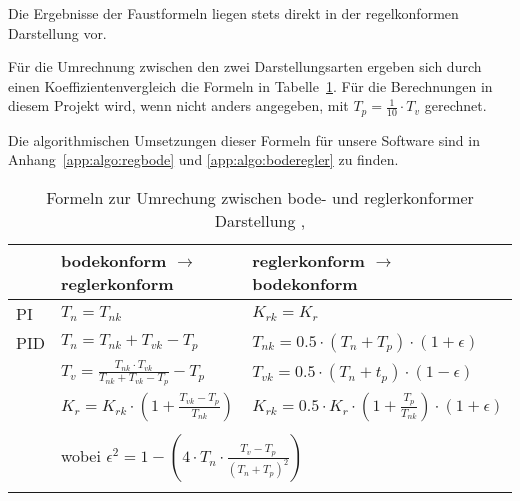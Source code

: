 Die  Ergebnisse der  Faustformeln liegen  stets direkt  in der  regelkonformen
Darstellung vor.

F\"ur     die    Umrechnung     zwischen     den    zwei     Darstellungsarten
ergeben   sich    durch   einen   Koeffizientenvergleich   die    Formeln   in
Tabelle~\ref{tab:bode_regler_konform}.   F\"ur  die   Berechnungen  in  diesem
Projekt wird,  wenn nicht anders  angegeben, mit $T_p=\frac{1}{10}  \cdot T_v$
gerechnet.

Die algorithmischen Umsetzungen  dieser Formeln f\"ur unsere  Software sind in
Anhang~\ref{app:algo:regbode} und \ref{app:algo:boderegler} zu finden.

\begin{longtable}{l|ll}
    \toprule


    &
    bodekonform $\rightarrow$ reglerkonform
    &
    reglerkonform $\rightarrow$ bodekonform
    \\

    \midrule

    \endhead
    \endfoot
    \endlastfoot


    PI
    &
    $T_n = T_{nk} $ %
    &
    $K_{rk} = K_r $ %
    \\

    \midrule

    PID
    &
    $T_n = T_{nk}+T_{vk}-T_p$
    &
    $T_{nk}=0.5 \cdot (T_n+T_p) \cdot (1+\epsilon)$
    \\

    &
    $T_v=\frac{T_{nk} \cdot T_{vk}}{T_{nk}+T_{vk}-T_p}-T_p$
    &
    $T_{vk}=0.5 \cdot (T_n+t_p) \cdot (1-\epsilon)$
    \\

    &
    $K_r=K_{rk} \cdot (1 + \frac{T_{vk}-T_p}{T_{nk}})$
    &
    $K_{rk} = 0.5 \cdot K_r \cdot (1 + \frac{T_p}{T_{nk}}) \cdot (1+\epsilon )$
    \\
    \\

    &
    \multicolumn{2}{l}{wobei $\epsilon^2 = 1-(4 \cdot T_n \cdot \frac{T_v-T_p}{(T_n+T_p)^2})$}
    \\
    \bottomrule
    \caption{Formeln zur Umrechung zwischen bode- und reglerkonformer Darstellung \cite{regelungstechnik:zellweger}, \cite{regelungstechnik:schumleon}}
    \label{tab:bode_regler_konform}
\end{longtable}
